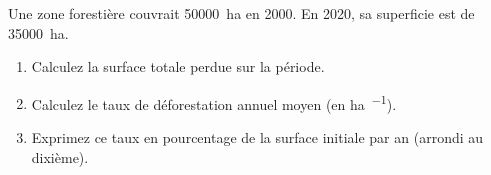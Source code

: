 \documentclass[11pt]{article}
\begin{document}
\begin{exercice}
Une zone forestière couvrait \SI{50000}{\hectare} en 2000. En 2020, sa superficie est de \SI{35000}{\hectare}.
\begin{enumerate}
    \item Calculez la surface totale perdue sur la période.
    \item Calculez le taux de déforestation annuel moyen (en \si{\hectare\per{}}).
    \item Exprimez ce taux en pourcentage de la surface initiale par an (arrondi au dixième).
\end{enumerate}
\end{exercice}
\end{document}
